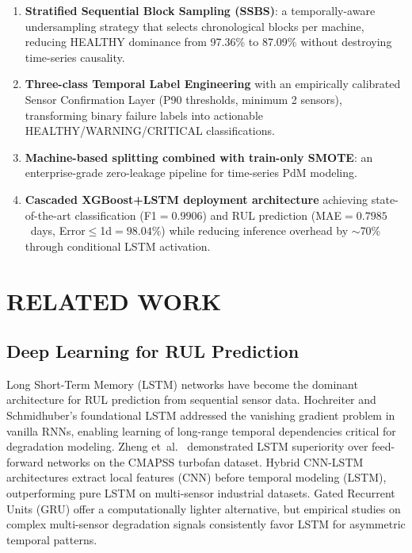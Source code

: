 \documentclass[conference]{IEEEtran}
\begin{document}
\begin{enumerate}
\item \textbf{Stratified Sequential Block Sampling (SSBS)}: a
  temporally-aware undersampling strategy that selects chronological blocks
  per machine, reducing HEALTHY dominance from 97.36\% to 87.09\% without
  destroying time-series causality.
\item \textbf{Three-class Temporal Label Engineering} with an empirically
  calibrated Sensor Confirmation Layer (P90 thresholds, minimum 2 sensors),
  transforming binary failure labels into actionable
  HEALTHY/WARNING/CRITICAL classifications.
\item \textbf{Machine-based splitting combined with train-only SMOTE}:
  an enterprise-grade zero-leakage pipeline for time-series PdM modeling.
\item \textbf{Cascaded XGBoost+LSTM deployment architecture} achieving
  state-of-the-art classification (F1$=0.9906$) and RUL prediction
  (MAE$=0.7985$~days, Error$\leq$1d$=98.04\%$) while reducing inference
  overhead by $\sim$70\% through conditional LSTM activation.
\end{enumerate}

\section{RELATED WORK}

\subsection{Deep Learning for RUL Prediction}
Long Short-Term Memory (LSTM) networks have become the dominant architecture
for RUL prediction from sequential sensor data. Hochreiter and
Schmidhuber's foundational LSTM \cite{hochreiter1997lstm} addressed the
vanishing gradient problem in vanilla RNNs, enabling learning of long-range
temporal dependencies critical for degradation modeling. Zheng et~al.\
\cite{zheng2017lstm_rul} demonstrated LSTM superiority over feed-forward
networks on the CMAPSS turbofan dataset. Hybrid CNN-LSTM architectures
\cite{li2018cnnlstm} extract local features (CNN) before temporal modeling
(LSTM), outperforming pure LSTM on multi-sensor industrial datasets. Gated
Recurrent Units (GRU) \cite{cho2014gru} offer a computationally lighter
alternative, but empirical studies on complex multi-sensor degradation
signals consistently favor LSTM for asymmetric temporal patterns.
\end{document}
